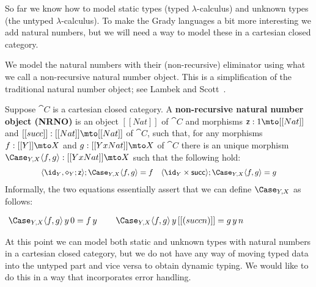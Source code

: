 So far we know how to model static types (typed $\lambda$-calculus)
and unknown types (the untyped $\lambda$-calculus).  To make the Grady
languages a bit more interesting we add natural numbers, but we will
need a way to model these in a cartesian closed category.

We model the natural numbers with their (non-recursive) eliminator
using what we call a non-recursive natural number object.  This is a
simplification of the traditional natural number object; see Lambek
and Scott~\cite{Lambek:1988}.
\begin{definition}
  \label{def:SNNO}
  Suppose $\cat{C}$ is a cartesian closed category.  A
  \textbf{non-recursive natural number object (NRNO)} is an object
  $[[Nat]]$ of $\cat{C}$ and morphisms $\mathsf{z} : 1 \mto [[Nat]]$
  and $[[succ]] : [[Nat]] \mto [[Nat]]$ of $\cat{C}$, such that, for
  any morphisms $f : [[Y]] \mto X$ and $g : [[Y x Nat]] \mto X$ of
  $\cat{C}$ there is an unique morphism $\Case_{Y,X} \langle f,g \rangle : [[Y x Nat]] \mto X$
  such that the following hold:
  \[\small
  \setlength{\arraycolsep}{0pt}
  \begin{array}{cccccc}    
    \langle \id_Y, \diamond_Y;\mathsf{z} \rangle;\Case_{Y,X} \langle f,g \rangle = f & \quad &
    \langle \id_Y \times \mathsf{succ} \rangle;\Case_{Y,X} \langle f,g \rangle = g\\
  \end{array}
  \]  
  \noindent
       Informally, the two equations essentially assert that we can
       define $\Case_{Y,X}$ as follows:
       \begin{center}
         \begin{math}
           \setlength{\arraycolsep}{3pt}
           \begin{array}{ccccccccccc}
             {\Case_{Y,X} \langle f,g \rangle\,y\,0 = f\,y}
             & \quad & 
             {\Case_{Y,X} \langle f,g \rangle\,y\,[[(succ n)]] =  g\,y\,n}
           \end{array}
         \end{math}
       \end{center}
\end{definition}

At this point we can model both static and unknown types with natural
numbers in a cartesian closed category, but we do not have any way of
moving typed data into the untyped part and vice versa to obtain
dynamic typing.  We would like to do this in a way that incorporates
error handling.


